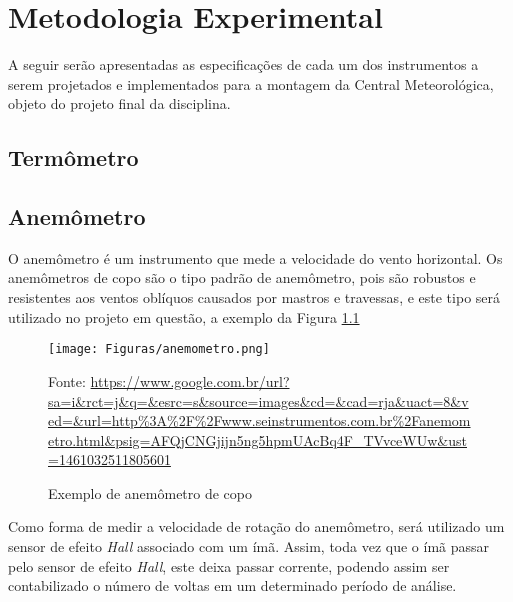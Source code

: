 \documentclass[12pt,a4paper]{instrumentacao}
\begin{document}
\chapter{Metodologia Experimental}
A seguir serão apresentadas as especificações de cada um dos instrumentos a serem projetados e implementados para a montagem da Central Meteorológica, objeto do projeto final da disciplina.

\section{Termômetro}


\section{Anemômetro}
O anemômetro é um instrumento que mede a velocidade do vento horizontal. Os anemômetros de copo são o tipo padrão de anemômetro, pois são robustos e resistentes aos ventos oblíquos causados por mastros e travessas, e este tipo será utilizado no projeto em questão, a exemplo da Figura \ref{fig:anemometro}

\begin{figure}[h]
	\centering
		\texttt{[image: Figuras/anemometro.png]}
	\caption{Exemplo de anemômetro de copo}
	Fonte: \url{https://www.google.com.br/url?sa=i&rct=j&q=&esrc=s&source=images&cd=&cad=rja&uact=8&ved=&url=http%3A%2F%2Fwww.seinstrumentos.com.br%2Fanemometro.html&psig=AFQjCNGjijn5ng5hpmUAcBq4F_TVvceWUw&ust=1461032511805601}
	\label{fig:anemometro}
\end{figure}

Como forma de medir a velocidade de rotação do anemômetro, será utilizado um sensor de efeito \textit{Hall} associado com um ímã. Assim, toda vez que o ímã passar pelo sensor de efeito \textit{Hall}, este deixa passar corrente, podendo assim ser contabilizado o número de voltas em um determinado período de análise.
\end{document}
